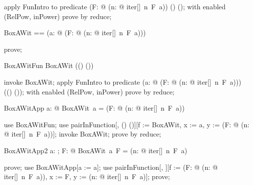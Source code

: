 \documentclass{article}
\begin{document}
\begin{zproof}
apply FunIntro to predicate (\lambda F: \nat \fun \nat @ (\lambda n: \nat @ iter[\nat]~n~F~a)) \in (\nat \fun \nat) \fun (\nat \fun \nat);
with enabled (RelPow, inPower) prove by reduce;
\end{zproof}

\begin{zed}
  BoxAWit == (\lambda a: \nat @ (\lambda F: \nat \fun \nat @ (\lambda n: \nat @ iter[\nat]~n~F~a)))
\end{zed}

\begin{zproof}
prove;
\end{zproof}

\begin{theorem}{BoxAWitFun}
  BoxAWit \in \nat \fun ((\nat \fun \nat) \fun (\nat \fun \nat))
\end{theorem}

\begin{zproof}
invoke BoxAWit;
apply FunIntro to predicate (\lambda a: \nat @ (\lambda F: \nat \fun \nat @ (\lambda n: \nat @ iter[\nat]~n~F~a))) \in \nat \fun ((\nat \fun \nat) \fun (\nat \fun \nat));
with enabled (RelPow, inPower) prove by reduce;
\end{zproof}

\begin{theorem}{BoxAWitApp}
  \forall a: \nat @ BoxAWit~a = (\lambda F: \nat \fun \nat @ (\lambda n: \nat @ iter[\nat]~n~F~a))
\end{theorem}

\begin{zproof}
use BoxAWitFun;
use pairInFunction[\nat, (\nat \fun \nat) \fun (\nat \fun \nat)][f := BoxAWit, x := a, y := (\lambda F: \nat \fun \nat @ (\lambda n: \nat @ iter[\nat]~n~F~a))];
invoke BoxAWit;
prove by reduce;
\end{zproof}

\begin{theorem}{BoxAWitApp2}
  \forall a: \nat; F: \nat \fun \nat @ BoxAWit~a~F = (\lambda n: \nat @ iter[\nat]~n~F~a)
\end{theorem}

\begin{zproof}
prove;
use BoxAWitApp[a := a];
use pairInFunction[\nat \fun \nat, \nat \fun \nat][f := (\lambda F: \nat \fun \nat @ (\lambda n: \nat @ iter[\nat]~n~F~a)), x := F, y := (\lambda n: \nat @ iter[\nat]~n~F~a)];
prove;
\end{zproof}
\end{document}
